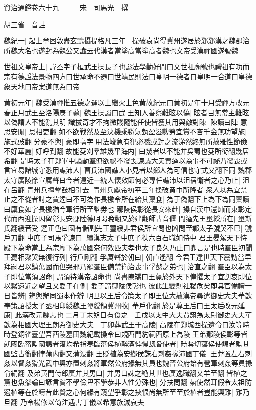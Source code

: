 資治通鑑卷六十九　　　宋　司馬光　撰

胡三省　音註

魏紀一|{
	起上章困敦盡玄黓攝提格凡三年　操破袁尚得冀州遂居於鄴鄴漢之魏郡治所魏大名也遂封為魏公又䜟云代漢者當塗高當塗高者魏也文帝受漢禪國遂號魏}


世祖文皇帝上|{
	諱丕字子桓武王操長子也謚法學勤好問曰文世祖廟號也禮祖有功而宗有德諡法景物四方曰世承命不遷曰世靖民則法曰皇明一德者曰皇明一合道曰皇德象天地曰帝案道無為曰帝}


黄初元年|{
	魏受漢禪推五德之運以土繼火土色黄故紀元曰黄初是年十月受禪方改元}
春正月武王至洛陽庚子薨|{
	魏王操謚曰武}
王知人善察難眩以偽|{
	眩者目無常主難眩以偽謂人不能亂其明}
識拔奇才不拘微賤隨能任使皆獲其用與敵對陳|{
	陳讀曰陣}
意思安閒|{
	思相吏翻}
如不欲戰然及至決機乘勝氣埶盈溢勲勞宜賞不吝千金無功望施|{
	施式䜴翻}
分豪不與|{
	豪即亳字}
用法峻急有犯必戮或對之流涕然終無所赦雅性節儉不好華麗|{
	好呼到翻}
故能芟刈羣雄幾平海内|{
	曰幾者以不能并吳蜀也芟所銜翻幾居希翻}
是時太子在鄴軍中騷動羣僚欲祕不發喪諫議大夫賈逵以為事不可祕乃發喪或言宜易諸城守悉用譙沛人|{
	曹氏沛國譙人小見者以鄉人為可信也守式又翻下同}
魏郡太守廣陵徐宣厲聲曰今者遠近一統人懷效節何必專任譙沛以沮宿衛者之心乃止|{
	沮在呂翻}
青州兵擅擊鼓相引去|{
	青州兵獻帝初平三年操破黄巾所降者}
衆人以為宜禁止之不從者討之賈逵曰不可為作長檄令所在給其稟食|{
	為于偽翻下上為下為同稟讀曰廩食如字長檄猶今軍行所至幇劵也}
鄢陵侯彰從長安來赴|{
	操自漢中還師而東彰定代而西迎操因留彰長安鄢陸德明謁晩翻又於建翻師古音偃}
問逵先王璽綬所在|{
	璽斯氏翻綬音受}
逵正色曰國有儲副先王璽綬非君侯所宜問也凶問至鄴太子號哭不巳|{
	號戶刀翻}
中庶子司馬孚諫曰|{
	續漢志太子中庶子秩六百石職如侍中}
君王晏駕天下恃殿下為命當上為宗廟下為萬國奈何效匹夫孝也太子良久乃止曰卿言是也時羣臣初聞王薨相聚哭無復行列|{
	行戶剛翻}
孚厲聲於朝曰|{
	朝直遙翻}
今君王違世天下震動當早拜嗣君以鎮萬國而但哭邪乃罷羣臣備禁衛治喪事孚懿之弟也|{
	治直之翻}
羣臣以為太子即位當須詔命|{
	謂須待漢帝詔命也}
尚書陳矯曰王薨於外天下惶懼太子宜割哀即位以繫遠近之望且又愛子在側|{
	愛子謂鄢陵侯彰也}
彼此生變則社稷危矣即具官備禮一日皆辨|{
	辨與辦同蜀本作辦}
明旦以王后令策太子即王位大赦漢帝尋遣御史大夫華歆奉策詔授太子丞相印綬魏王璽綬領冀州牧|{
	華戶化翻}
於是尊王后曰王太后改元延康|{
	此漢改元魏志也}
二月丁未朔日有食之　壬戌以太中大夫賈詡為太尉御史大夫華歆為相國大理王朗為御史大夫　丁卯葬武王于高陵|{
	高陵在鄴城西操遺令曰汝等時時登銅雀臺望吾西陵墓田魏紀載操令曰規西門豹祠西原上為陵}
王弟鄢陵侯彰等皆就國臨菑監國謁者灌均希指奏臨菑侯植醉酒悖慢刼脅使者|{
	時禁切藩侯使謁者監其國監古銜翻悖蒲内翻又蒲没翻}
王貶植為安鄉侯誅右刺姦掾沛國丁儀|{
	王莽置左右刺姦以督姦猾光武中興亦置刺姦將軍然公府掾無其員也魏晉公府始有營軍刺姦等員掾俞絹翻}
及弟黄門侍郎廙并其男口|{
	并男口誅之絶其世也廙逸職翻又羊至翻}
皆植之黨也魚豢論曰諺言貧不學儉卑不學恭非人性分殊也|{
	分扶問翻}
埶使然耳假令太祖防遏植等在於疇昔此賢之心何緣有窺望乎彰之挾恨尚無所至至於植者豈能興難|{
	難乃旦翻}
乃令楊修以倚注遇害丁儀以希意族滅哀夫

